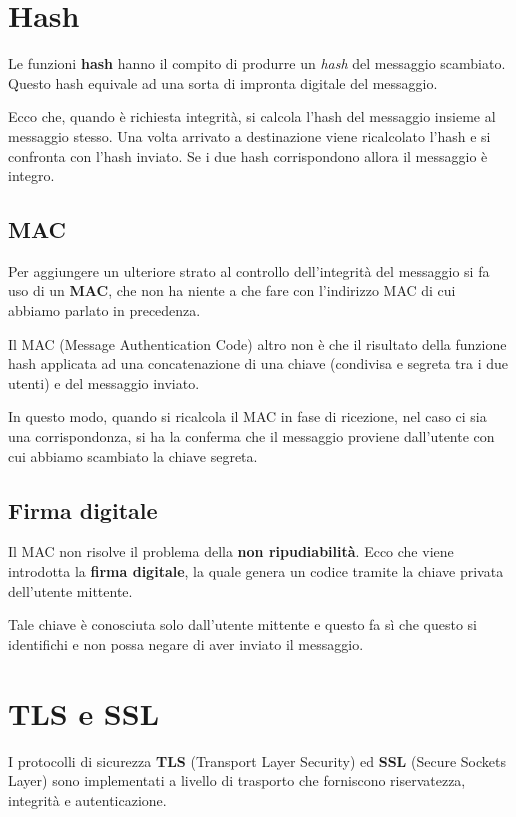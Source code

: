 \section{Hash}
Le funzioni \textbf{hash} hanno il compito di produrre un \emph{hash}
del messaggio scambiato. Questo hash equivale ad una sorta di impronta
digitale del messaggio.

Ecco che, quando è richiesta integrità, si calcola l'hash del messaggio
insieme al messaggio stesso. Una volta arrivato a destinazione viene
ricalcolato l'hash e si confronta con l'hash inviato. Se i due hash
corrispondono allora il messaggio è integro.

\subsection{MAC}
Per aggiungere un ulteriore strato al controllo dell'integrità del
messaggio si fa uso di un \textbf{MAC}, che non ha niente a che fare
con l'indirizzo MAC di cui abbiamo parlato in precedenza.

Il MAC (Message Authentication Code) altro non è che il risultato della
funzione hash applicata ad una concatenazione di una chiave (condivisa 
e segreta tra i due utenti) e del messaggio inviato.

In questo modo, quando si ricalcola il MAC in fase di ricezione, nel
caso ci sia una corrispondonza, si ha la conferma che il messaggio 
proviene dall'utente con cui abbiamo scambiato la chiave segreta.

\subsection{Firma digitale}
Il MAC non risolve il problema della \textbf{non ripudiabilità}. Ecco
che viene introdotta la \textbf{firma digitale}, la quale genera un
codice tramite la chiave privata dell'utente mittente.

Tale chiave è conosciuta solo dall'utente mittente e questo fa sì che
questo si identifichi e non possa negare di aver inviato il messaggio.

\section{TLS e SSL}
I protocolli di sicurezza \textbf{TLS} (Transport Layer Security) ed
\textbf{SSL} (Secure Sockets Layer) sono implementati a livello di
trasporto che forniscono riservatezza, integrità e autenticazione.

